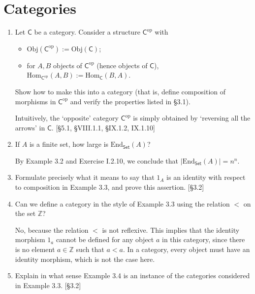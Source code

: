 \section{Categories}
\begin{enumerate}
    \item Let $\mathsf{C}$ be a category. Consider a structure $\mathsf{C}^{\mathrm{op}}$ with
          \begin{itemize}
              \item $\mathrm{Obj}(\mathsf{C}^{\mathrm{op}}) := \mathrm{Obj}(\mathsf{C})$;
              \item for $A, B$ objects of $\mathsf{C}^{\mathrm{op}}$ (hence objects of $\mathsf{C}$), $\mathrm{Hom}_{\mathsf{C}^{\mathrm{op}}}(A, B) := \mathrm{Hom}_{\mathsf{C}}(B, A)$.
          \end{itemize}
          Show how to make this into a category (that is, define composition of morphisms in $\mathsf{C}^{\mathrm{op}}$ and verify the properties listed in \S3.1).

          Intuitively, the `opposite' category $\mathsf{C}^{\mathrm{op}}$ is simply obtained by `reversing all the arrows' in $\mathsf{C}$. [\S5.1, \S VIII.1.1, \S IX.1.2, IX.1.10]

    \item If $A$ is a finite set, how large is $\mathrm{End}_{\mathsf{Set}}(A)$?
        \begin{solution}
            By Example 3.2 and Exercise I.2.10, we conclude that $|\mathrm{End}_{\mathsf{Set}}(A)|=n^n$.
        \end{solution}
    \item Formulate precisely what it means to say that $1_A$ is an identity with respect to composition in Example 3.3, and prove this assertion. [\S3.2]

    \item Can we define a category in the style of Example 3.3 using the relation $<$ on the set $\mathbb{Z}$?
    
    \begin{solution}
        No, because the relation $<$ is not reflexive. This implies that the identity morphism $1_a$ cannot be defined for any object $a$ in this category, since there is no element $a \in \mathbb{Z}$ such that $a < a$. In a category, every object must have an identity morphism, which is not the case here.
    \end{solution}

    \item Explain in what sense Example 3.4 is an instance of the categories considered in Example 3.3. [\S3.2]


\end{enumerate}

